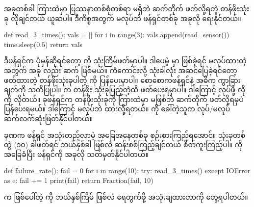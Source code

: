အခုတစ်ခါ ကြားထဲမှာ ပြဿနာတစ်စုံတစ်ရာ မရှိဘဲ ဆက်တိုက် ဖတ်လို့ရတဲ့ တန်ဖိုးသုံးခု လိုချင်တယ် ယူဆပါ။ ဒီကိစ္စအတွက်  မလုပ်ဘဲ ဖန်ရှင်တစ်ခု အခုလို ရေးနိုင်တယ်။ 

%
\begin{py}
def read_3_times():
    vals = []
    for i in range(3):
        vals.append(read_sensor())
        time.sleep(0.5)
    return vals
\end{py}
%
ဒီဖန်ရှင်က ပုံမှန်ဆိုရင်တော့   ကို သုံးကြိမ်ဖတ်မှာပါ။ ဒါပေမဲ့  မှာ   ဖြစ်ခဲ့ရင်  မလုပ်ထားတဲ့အတွက်  အခု  လည်း ဆက်  ဖြစ်မယ်။ ကံကောင်းလို့ သုံးခါလုံး အဆင်ပြေခဲ့ရင်တော့ ဖတ်ထားတဲ့ တန်ဖိုးသုံးခုပါတဲ့  ကို ပြန်ပေးမှာပါ။  စောစောကဖန်ရှင်နဲ့ အဓိက ကွာခြားချက်ကို သတိပြုပါ။  က တန်ဖိုး သုံးခုပြည့်တဲ့ထိ ဖတ်ပေးရမှာပါ။ ဒါကြောင့်  လုပ်ဖို့ လိုကို လိုတယ်။ ခုဖန်ရှင်က တန်ဖိုးသုံးခုကို ကြားထဲမှာ  မဖြစ်ဘဲ ဆက်တိုက်  ဖတ်လို့ရမှပဲ ပြန်ပေးရမယ်။ ဒါကြောင့်  မလုပ်ဘဲ ထားလို့ရတယ်။  ကို ခေါ်တဲ့သူက  လုပ်/မလုပ် ဆက်လက်ဆုံးဖြတ်နိုင်ပါတယ်။

ခုဏက ဖန်ရှင် အသုံးတည့်လာမဲ့ အခြေအနေတစ်ခု စဉ်းစားကြည့်ရအောင်။ သုံးခုတစ်တွဲ (၁၀) ခါဖတ်ရင် ဘယ်နှစ်ခါ  ဖြစ်လဲ ဆန်းစစ်ကြည့်ချင်တယ် စိတ်ကူးကြည့်ပါ။  ကို အခြေခံပြီး   ဖန်ရှင်ကို အခုလို သတ်မှတ်နိုင်ပါတယ်။ 
%
\begin{py}
def failure_rate():
    fail = 0
    for i in range(10):
        try:
            read_3_times()
        except IOError as e:
            fail += 1
    print(fail)
    return Fraction(fail, 10)
\end{py}
%
 က ဖြစ်ပေါ်တဲ့  ကို ဘယ်နှစ်ကြိမ်  ဖြစ်လဲ ရေတွက်ဖို့ အသုံးချထားတာကို တွေ့ရပါတယ်။





